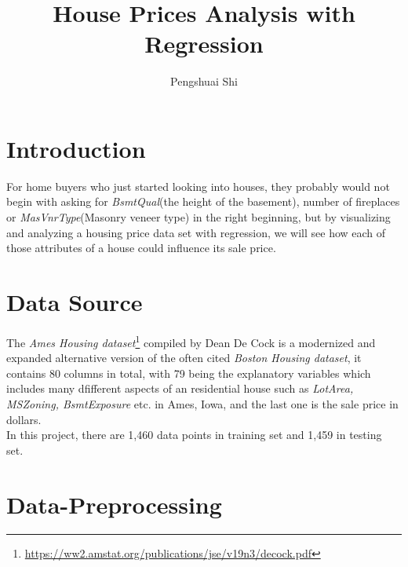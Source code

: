 \documentclass[12pt]{article}
\begin{document}
	\title{House Prices Analysis with Regression}
	\author{Pengshuai Shi}
	\maketitle
	
\section{Introduction}
For home buyers who just started looking into houses, they probably would not begin with asking for \textit{BsmtQual}(the height of the basement), number of fireplaces or \textit{MasVnrType}(Masonry veneer type) in the right beginning, but by visualizing and analyzing a housing price data set with regression, we will see how each of those attributes of a house could influence its sale price.
\section{Data Source}
The \textit{Ames Housing dataset}\footnote{\url{https://ww2.amstat.org/publications/jse/v19n3/decock.pdf}} compiled by Dean De Cock is a modernized and expanded alternative version of the often cited \textit{Boston Housing dataset}, it contains 80 columns in total, with 79 being the explanatory variables which includes many dfifferent aspects of an residential house such as \textit{LotArea, MSZoning, BsmtExposure} etc. in Ames, Iowa, and the last one is the sale price in dollars. 
\\
In this project, there are 1,460 data points in training set and 1,459 in testing set.
\section{Data-Preprocessing}
\end{document}
